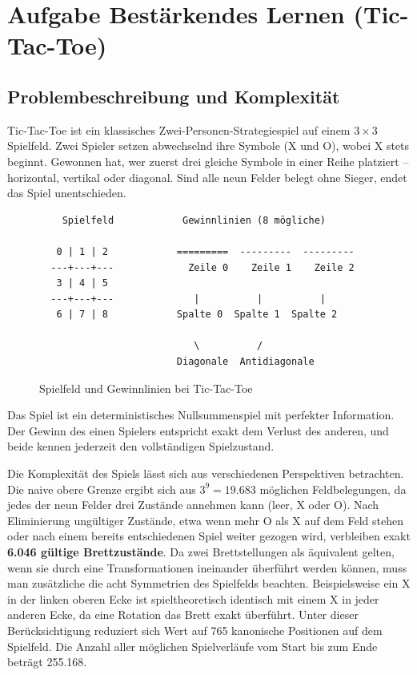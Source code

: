 
\chapter{Aufgabe Bestärkendes Lernen (Tic-Tac-Toe)}

\section{Problembeschreibung und Komplexität}

Tic-Tac-Toe ist ein klassisches Zwei-Personen-Strategiespiel auf einem $3 \times 3$ Spielfeld. Zwei Spieler setzen abwechselnd ihre Symbole (X und O), wobei X stets beginnt. Gewonnen hat, wer zuerst drei gleiche Symbole in einer Reihe platziert -- horizontal, vertikal oder diagonal. Sind alle neun Felder belegt ohne Sieger, endet das Spiel unentschieden.

\begin{figure}[H]
\centering
\begin{verbatim}
    Spielfeld            Gewinnlinien (8 mögliche)
                    
   0 | 1 | 2            =========  ---------  ---------
  ---+---+---             Zeile 0    Zeile 1    Zeile 2
   3 | 4 | 5            
  ---+---+---              |          |          |
   6 | 7 | 8            Spalte 0  Spalte 1  Spalte 2
                    
                           \          /
                        Diagonale  Antidiagonale
\end{verbatim}
\caption{Spielfeld und Gewinnlinien bei Tic-Tac-Toe}
\end{figure}

Das Spiel ist ein deterministisches Nullsummenspiel mit perfekter Information. Der Gewinn des einen Spielers entspricht exakt dem Verlust des anderen, und beide kennen jederzeit den vollständigen Spielzustand.

Die Komplexität des Spiels lässt sich aus verschiedenen Perspektiven betrachten. Die naive obere Grenze ergibt sich aus $3^9 = 19.683$ möglichen Feldbelegungen, da jedes der neun Felder drei Zustände annehmen kann (leer, X oder O). Nach Eliminierung ungültiger Zustände, etwa wenn mehr O als X auf dem Feld stehen oder nach einem bereits entschiedenen Spiel weiter gezogen wird, verbleiben exakt \textbf{6.046 gültige Brettzustände}. Da zwei Brettstellungen als äquivalent gelten, wenn sie durch eine Transformationen ineinander überführt werden können, muss man zusätzliche die acht Symmetrien des Spielfelds beachten.\autocite{noauthor_group_2026} Beispielsweise ein X in der linken oberen Ecke ist spieltheoretisch identisch mit einem X in jeder anderen Ecke, da eine Rotation das Brett exakt überführt. Unter dieser Berücksichtigung reduziert sich Wert auf 765 kanonische Positionen auf dem Spielfeld. Die Anzahl aller möglichen Spielverläufe vom Start bis zum Ende beträgt 255.168.\autocite{jeff_what_2025}

